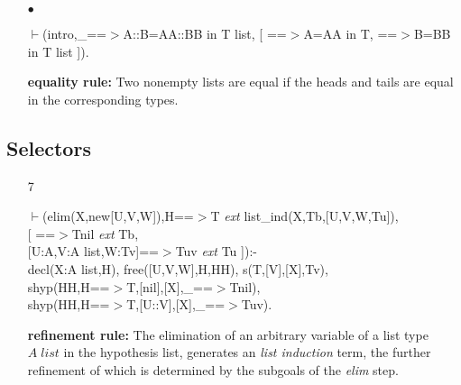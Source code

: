 \documentclass[11pt]{report}
\begin{document}
\begin{enumerate}
 \item[$\bullet$]
\begin{sf}\begin{tabbing}
$\vdash$(intro,\_\hspace{0.1em}==$>$A::B=AA::BB in T list, [ ==$>$A=AA in T, ==$>$B=BB in T list ]).
\end{tabbing}\end{sf}

 {\bf equality rule:}
 Two nonempty lists are equal if the heads and tails are equal
 in the corresponding types.
 \end{enumerate}
  
 \subsection{Selectors}
 \begin{enumerate}
 \item[7]
\begin{sf}\begin{tabbing}
$\vdash$(elim(X,new[U,V,W]),H==$>$T \mbox{\it ext} list\_\hspace{0.1em}ind(X,Tb,[U,V,W,Tu]),\\[-0.15ex]
\hspace{2em}[ ==$>$Tnil \mbox{\it ext} Tb, \\[-0.15ex]
\hspace{3em}[U:A,V:A list,W:Tv]==$>$Tuv \mbox{\it ext} Tu ]):-\\[-0.15ex]
\hspace{2em}decl(X:A list,H), free([U,V,W],H,HH), s(T,[V],[X],Tv),\\[-0.15ex]
\hspace{2em}shyp(HH,H==$>$T,[nil],[X],\_\hspace{0.1em}==$>$Tnil),\\[-0.15ex]
\hspace{2em}shyp(HH,H==$>$T,[U::V],[X],\_\hspace{0.1em}==$>$Tuv).
\end{tabbing}\end{sf}

 {\bf refinement rule:}
 The elimination of an arbitrary variable of a list type $A\; list$ in
 the hypothesis list, generates an \emph{list induction} term, the 
 further refinement of which is determined by the subgoals
 of the \emph{elim} step.
  

\end{enumerate}
\end{document}
